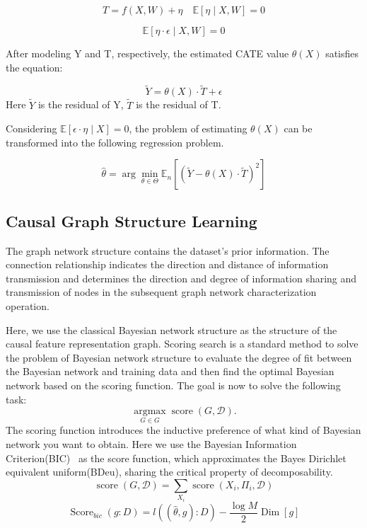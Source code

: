 \documentclass[sigconf,screen]{acmart}
\begin{document}
\begin{equation}
T=f(X, W)+\eta \quad \mathbb{E}[\eta \mid X, W]=0
\end{equation}

\begin{equation}
\mathbb{E}[\eta \cdot \epsilon \mid X, W]=0
\end{equation}

After modeling Y and T, respectively, the estimated CATE value $\theta(X)$ satisfies the equation:

\begin{equation}
    \tilde{Y}=\theta(X) \cdot \tilde{T}+\epsilon
\end{equation}
Here $\tilde{Y}$ is the residual of Y, $\tilde{T}$ is the residual of T.

Considering  $\mathbb{E}[\epsilon \cdot \eta \mid X]=0$, the problem of estimating  $\theta(X)$ can be transformed into the following regression problem.

\begin{equation}
    \hat{\theta}=\arg \min _{\theta \in \Theta} \mathbb{E}_{n}\left[(\tilde{Y}-\theta(X) \cdot \tilde{T})^{2}\right]
\end{equation}



\subsection{Causal Graph Structure Learning}
The graph network structure contains the dataset's prior information. The connection relationship indicates the direction and distance of information transmission and determines the direction and degree of information sharing and transmission of nodes in the subsequent graph network characterization operation.

Here, we use the classical Bayesian network structure as the structure of the causal feature representation graph. Scoring search is a standard method to solve the problem of Bayesian network structure to evaluate the degree of fit between the Bayesian network and training data and then find the optimal Bayesian network based on the scoring function. The goal is now to solve the following task:
\begin{equation}
    \underset{G \in G}{\operatorname{argmax}} \operatorname{score}(G, \mathcal{D}) .
\end{equation}
The scoring function introduces the inductive preference of what kind of Bayesian network you want to obtain. Here we use the Bayesian Information Criterion(BIC)~\citep{BIC:Neath} as the score function, which approximates the Bayes Dirichlet equivalent uniform(BDeu), sharing the critical property of decomposability.
\begin{equation}
    \operatorname{score}(G, \mathcal{D})=\sum_{X_{i}} \operatorname{score}\left(X_{i}, \Pi_{i}, \mathcal{D}\right)
\end{equation}
\begin{equation}
    \operatorname{Score}_{b i c}(g: D)=l((\hat{\theta}, g): D)-\frac{\log M}{2} \operatorname{Dim}[g]
\end{equation}
\end{document}
